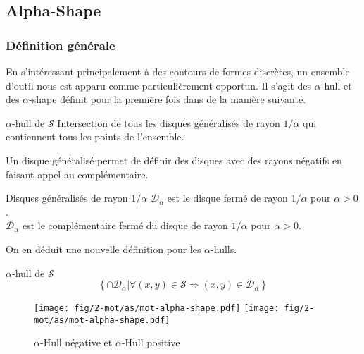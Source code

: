 \subsection{Alpha-Shape}

\subsubsection{Définition générale}

En s'intéressant principalement à des contours de formes discrètes, un ensemble d'outil nous est apparu comme particulièrement opportun. Il s'agit des $\alpha$-hull et des $\alpha$-shape définit pour la première fois dans \cite{EdeKirSei83} de la manière suivante.\\

\begin{Definition}{$\alpha$-hull de $\mathcal{S}$}
\label{def:ah-txt}
    Intersection de tous les disques généralisés de rayon $1/\alpha$ qui contiennent tous les points de l'ensemble.
\end{Definition}

Un disque généralisé permet de définir des disques avec des rayons négatifs en faisant appel au complémentaire.

\begin{Definition}{Disques généralisés de rayon $1/\alpha$}
\label{def:dis-gen}
   $\mathcal{D}_{\alpha}$ est le disque fermé de rayon $1/\alpha$ pour $\alpha > 0$.\\
   $\mathcal{D}_{\alpha}$ est le complémentaire fermé du disque de rayon $1/\alpha$ pour $\alpha > 0$.
\end{Definition}

On en déduit une nouvelle définition pour les $\alpha$-hulls.

\begin{Definition}{$\alpha$-hull de $\mathcal{S}$}
\label{def:ah}
    $$\left\{ \cap \mathcal{D}_{\alpha} | \forall (x,y)\in \mathcal{S} \Rightarrow (x,y) \in \mathcal{D}_{\alpha} \right\}$$
\end{Definition}

\begin{figure}[h!]
  \centering
  \texttt{[image: fig/2-mot/as/mot-alpha-shape.pdf]}
  \texttt{[image: fig/2-mot/as/mot-alpha-shape.pdf]}
  \caption{$\alpha$-Hull négative et $\alpha$-Hull positive }
\end{figure}
  

